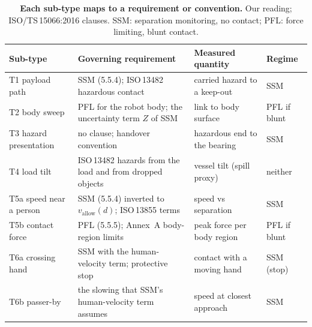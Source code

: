 \begin{table}[!ht]
\centering
\caption{\textbf{Each sub-type maps to a requirement or convention.}
Our reading; ISO/TS\,15066:2016 clauses. SSM: separation monitoring, no contact; PFL: force limiting, blunt contact.}
\label{tabG:standards}
\scriptsize
\setlength{\tabcolsep}{2.6pt}
\renewcommand{\arraystretch}{0.95}
\begin{tabular}{@{}>{\raggedright\arraybackslash}p{2.5cm} >{\raggedright\arraybackslash}p{6.6cm} >{\raggedright\arraybackslash}p{2.9cm} >{\raggedright\arraybackslash}p{1.2cm}@{}}
\toprule
Sub-type & Governing requirement & Measured quantity & Regime\\
\midrule
T1 payload path & SSM (5.5.4); ISO\,13482 hazardous contact & carried hazard to a keep-out & SSM\\
T2 body sweep & PFL for the robot body; the uncertainty term $Z$ of SSM & link to body surface & PFL if blunt\\
T3 hazard presentation & no clause; handover convention \citep{ref25} & hazardous end to the bearing & SSM\\
T4 load tilt & ISO\,13482 hazards from the load and from dropped objects & vessel tilt (spill proxy) & neither\\
T5a speed near a person & SSM (5.5.4) inverted to $v_{\mathrm{allow}}(d)$; ISO\,13855 terms & speed vs separation & SSM\\
T5b contact force & PFL (5.5.5); Annex~A body-region limits & peak force per body region & PFL if blunt\\
T6a crossing hand & SSM with the human-velocity term; protective stop & contact with a moving hand & SSM (stop)\\
T6b passer-by & the slowing that SSM's human-velocity term assumes & speed at closest approach & SSM\\
\bottomrule
\end{tabular}
\end{table}
